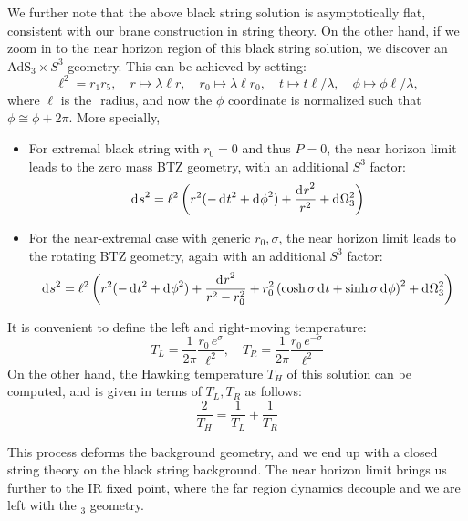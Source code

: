 \documentclass[11pt,a4paper]{article}
\newcommand{\ads}[1]{\text{AdS}\ensuremath{_{#1}}}
\begin{document}
	We further note that the above black string solution is asymptotically flat, consistent with our brane construction in string theory. On the other hand, if we zoom in to the near horizon region of this black string solution, we discover an $\ads{3}\times S^3$ geometry. This can be achieved by setting:
	\begin{equation}
		\ell^2 = r_1 r_5,
	\quad r\mapsto \lambda\ell r,
	\quad r_0\mapsto \lambda\ell r_0,
	\quad t\mapsto t\ell / \lambda,
	\quad \phi\mapsto \phi\ell / \lambda,
	\end{equation}
	where $\ell$ is the \ads{} radius, and now the $\phi$ coordinate is normalized such that $\phi \cong \phi + 2\pi$. 
	More specially,
	\begin{itemize}
	\item For extremal black string with $r_0 = 0$ and thus $P = 0$, the near horizon limit leads to the zero mass BTZ geometry, with an additional $S^3$ factor:
	\begin{equation}
		\mathinner{\mathrm{d}^{}s}^2
		= \ell^2 \left(
			r^2 (-\mathinner{\mathrm{d}^{}t}^2 + \mathinner{\mathrm{d}^{}\phi}^2)
			+ \frac{\mathinner{\mathrm{d}^{}r}^2}{r^2}
			+ \mathinner{\mathrm{d}^{}\Omega_3^2}
		\right)
	\end{equation}
	
	\item For the near-extremal case with generic $r_0, \sigma$, the near horizon limit leads to the rotating BTZ geometry, again with an additional $S^3$ factor:
	\begin{equation}
		\mathinner{\mathrm{d}^{}s}^2
		= \ell^2 \left(
			r^2 (-\mathinner{\mathrm{d}^{}t}^2 + \mathinner{\mathrm{d}^{}\phi}^2)
			+ \frac{\mathinner{\mathrm{d}^{}r}^2}{r^2 - r_0^2}
			+ r_0^2 \left(
				\cosh\sigma \mathinner{\mathrm{d}^{}t}
				+ \sinh\sigma \mathinner{\mathrm{d}^{}\phi}
			\right)^2
			+ \mathinner{\mathrm{d}^{}\Omega_3^2}
		\right)
	\end{equation}
	
	\end{itemize}
	
	It is convenient to define the left and right-moving temperature:
	\begin{equation}
		T_L = \frac{1}{2\pi}
			\frac{r_0\,e^\sigma}{\ell^2},
	\quad
		T_R = \frac{1}{2\pi}
			\frac{r_0\,e^{-\sigma}}{\ell^2}
	\end{equation}
	On the other hand, the Hawking temperature $T_H$ of this solution can be computed, and is given in terms of $T_L,T_R$ as follows:
	\begin{equation}
		\frac{2}{T_H}
		= \frac{1}{T_L}
		+ \frac{1}{T_R}
	\end{equation}
	
	 This process deforms the background geometry, and we end up with a closed string theory on the black string background. The near horizon limit brings us further to the IR fixed point, where the far region dynamics decouple and we are left with the \ads{3} geometry. 
	
\end{document}
